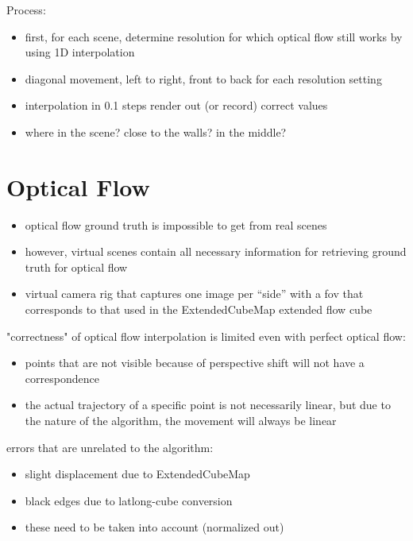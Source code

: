 Process:
\begin{itemize}
  \item first, for each scene, determine resolution for which optical flow still works by using 1D interpolation 
  \item diagonal movement, left to right, front to back for each resolution setting
  \item interpolation in 0.1 steps \ar render out (or record) correct values
  \item where in the scene? close to the walls? in the middle?
\end{itemize}

\section{Optical Flow}
\begin{itemize}
  \item optical flow ground truth is impossible to get from real scenes
  \item however, virtual scenes contain all necessary information for retrieving ground truth for optical flow
  \item virtual camera rig that captures one image per ``side'' with a fov that corresponds to that used in the ExtendedCubeMap \ar extended flow cube
\end{itemize}

"correctness" of optical flow interpolation is limited even with perfect optical flow:
\begin{itemize}
   \item points that are not visible because of perspective shift will not have a correspondence
   \item the actual trajectory of a specific point is not necessarily linear, but due to the nature of the algorithm, the movement will always be linear
\end{itemize}
errors that are unrelated to the algorithm:
\begin{itemize}
  \item slight displacement due to ExtendedCubeMap
  \item black edges due to latlong-cube conversion
  \item these need to be taken into account (normalized out)
\end{itemize}
